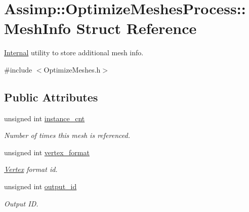 \hypertarget{struct_assimp_1_1_optimize_meshes_process_1_1_mesh_info}{\section{Assimp\+:\+:Optimize\+Meshes\+Process\+:\+:Mesh\+Info Struct Reference}
\label{struct_assimp_1_1_optimize_meshes_process_1_1_mesh_info}
}


\hyperlink{struct_internal}{Internal} utility to store additional mesh info.  




{\ttfamily \#include $<$Optimize\+Meshes.\+h$>$}

\subsection*{Public Attributes}
\begin{DoxyCompactItemize}
\item 
\hypertarget{struct_assimp_1_1_optimize_meshes_process_1_1_mesh_info_a65c2a4b93dae8fea6d4c2342a2cff8f5}{unsigned int \hyperlink{struct_assimp_1_1_optimize_meshes_process_1_1_mesh_info_a65c2a4b93dae8fea6d4c2342a2cff8f5}{instance\+\_\+cnt}}\label{struct_assimp_1_1_optimize_meshes_process_1_1_mesh_info_a65c2a4b93dae8fea6d4c2342a2cff8f5}

\begin{DoxyCompactList}\small\item\em Number of times this mesh is referenced. \end{DoxyCompactList}\item 
\hypertarget{struct_assimp_1_1_optimize_meshes_process_1_1_mesh_info_aaac4edb1250ef63c1b5c733f0658a55e}{unsigned int \hyperlink{struct_assimp_1_1_optimize_meshes_process_1_1_mesh_info_aaac4edb1250ef63c1b5c733f0658a55e}{vertex\+\_\+format}}\label{struct_assimp_1_1_optimize_meshes_process_1_1_mesh_info_aaac4edb1250ef63c1b5c733f0658a55e}

\begin{DoxyCompactList}\small\item\em \hyperlink{class_assimp_1_1_vertex}{Vertex} format id. \end{DoxyCompactList}\item 
\hypertarget{struct_assimp_1_1_optimize_meshes_process_1_1_mesh_info_a71defa9350c6dfd30817f96de14a09cd}{unsigned int \hyperlink{struct_assimp_1_1_optimize_meshes_process_1_1_mesh_info_a71defa9350c6dfd30817f96de14a09cd}{output\+\_\+id}}\label{struct_assimp_1_1_optimize_meshes_process_1_1_mesh_info_a71defa9350c6dfd30817f96de14a09cd}

\begin{DoxyCompactList}\small\item\em Output I\+D. \end{DoxyCompactList}\end{DoxyCompactItemize}


